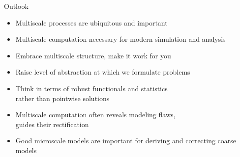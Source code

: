 \documentclass{beamer}
\begin{document}







\begin{frame}{Outlook}
  \begin{itemize}
  \item Multiscale processes are ubiquitous and important
  \item Multiscale computation necessary for modern simulation and analysis
  \item Embrace multiscale structure, make it work for you
  \item Raise level of abstraction at which we formulate problems
  \item Think in terms of robust functionals and statistics \\ rather than pointwise solutions
  \item Multiscale computation often reveals modeling flaws, \\
    guides their rectification
  \item Good microscale models are important for deriving and correcting coarse models
  \end{itemize}
\end{frame}
\end{document}
